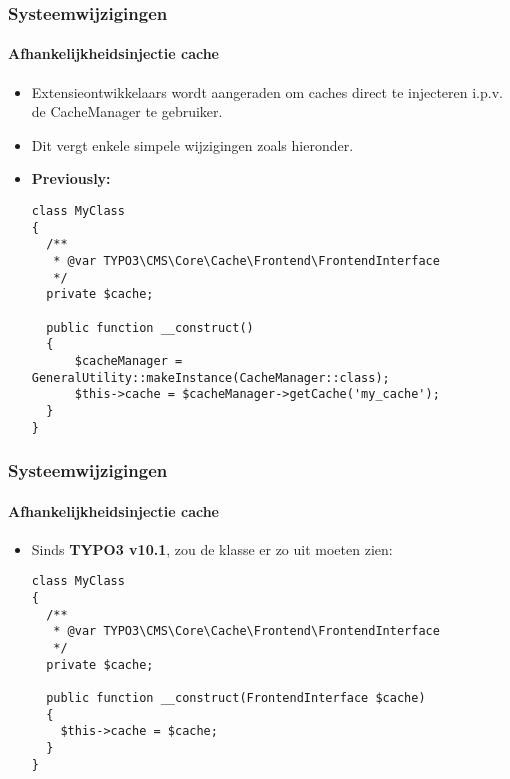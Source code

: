 
\begin{frame}[fragile]
	\frametitle{Systeemwijzigingen}
	\framesubtitle{Afhankelijkheidsinjectie cache}

	\lstset{basicstyle=\tiny\ttfamily}

	\begin{itemize}
		\item Extensieontwikkelaars wordt aangeraden om caches direct te injecteren i.p.v. de CacheManager
			te gebruiker.
		\item Dit vergt enkele simpele wijzigingen zoals hieronder.

		\item \textbf{Previously:}
\begin{lstlisting}
class MyClass
{
  /**
   * @var TYPO3\CMS\Core\Cache\Frontend\FrontendInterface
   */
  private $cache;

  public function __construct()
  {
      $cacheManager = GeneralUtility::makeInstance(CacheManager::class);
      $this->cache = $cacheManager->getCache('my_cache');
  }
}
\end{lstlisting}

	\end{itemize}

\end{frame}


\begin{frame}[fragile]
	\frametitle{Systeemwijzigingen}
	\framesubtitle{Afhankelijkheidsinjectie cache}

	\lstset{basicstyle=\tiny\ttfamily}

	\begin{itemize}
		\item Sinds \textbf{TYPO3 v10.1}, zou de klasse er zo uit moeten zien:
\begin{lstlisting}
class MyClass
{
  /**
   * @var TYPO3\CMS\Core\Cache\Frontend\FrontendInterface
   */
  private $cache;

  public function __construct(FrontendInterface $cache)
  {
    $this->cache = $cache;
  }
}
\end{lstlisting}

	\end{itemize}

\end{frame}

